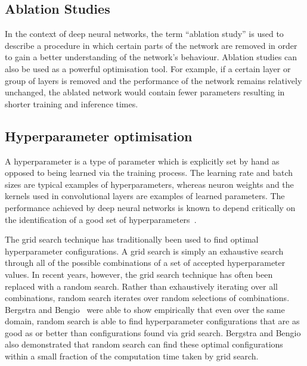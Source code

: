 \subsection{Ablation Studies}

In the context of deep neural networks, the term “ablation study” is used to describe a procedure in which certain parts of the network are removed in order to gain a better understanding of the network's behaviour. Ablation studies can also be used as a powerful optimisation tool. For example, if a certain layer or group of layers is removed and the performance of the network remains relatively unchanged, the ablated network would contain fewer parameters resulting in shorter training and inference times.

\subsection{Hyperparameter optimisation}
\label{sec:hyperparam}

A hyperparameter is a type of parameter which is explicitly set by hand as opposed to being learned via the training process. The learning rate and batch sizes are typical examples of hyperparameters, whereas neuron weights and the kernels used in convolutional layers are examples of learned parameters. The performance achieved by deep neural networks is known to depend critically on the identification of a good set of hyperparameters~\cite{hyperparam, goodhyperparam}.


The grid search technique has traditionally been used to find optimal hyperparameter configurations. A grid search is simply an exhaustive search through all of the possible combinations of a set of accepted hyperparameter values. In recent years, however, the grid search technique has often been replaced with a random search. Rather than exhaustively iterating over all combinations, random search iterates over random selections of combinations. Bergstra and Bengio~\cite{randomsearch} were able to show empirically that even over the same domain, random search is able to find hyperparameter configurations that are as good as or better than configurations found via grid search. Bergstra and Bengio also demonstrated that random search can find these optimal configurations within a small fraction of the computation time taken by grid search.

